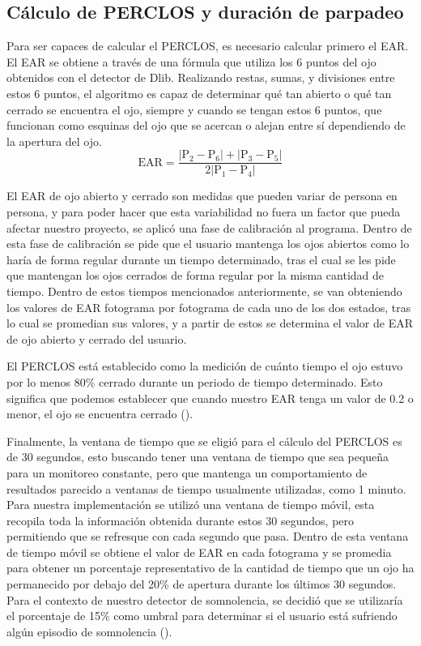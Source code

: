 \subsection{Cálculo de PERCLOS y duración de parpadeo}
Para ser capaces de calcular el PERCLOS, es necesario calcular primero el EAR. El EAR se obtiene a través de una fórmula que utiliza los 6 puntos del ojo obtenidos con el detector de Dlib. Realizando restas, sumas, y divisiones entre estos 6 puntos, el algoritmo es capaz de determinar qué tan abierto o qué tan cerrado se encuentra el ojo, siempre y cuando se tengan estos 6 puntos, que funcionan como esquinas del ojo que se acercan o alejan entre sí dependiendo de la apertura del ojo. 
\[
\mathrm{EAR} = \frac{|\mathrm{P}_2 - \mathrm{P}_6| + |\mathrm{P}_3 - \mathrm{P}_5|}{2|\mathrm{P}_1 - \mathrm{P}_4|}
\]

El EAR de ojo abierto y cerrado son medidas que pueden variar de persona en persona, y para poder hacer que esta variabilidad no fuera un factor que pueda afectar nuestro proyecto, se aplicó una fase de calibración al programa. Dentro de esta fase de calibración se pide que el usuario mantenga los ojos abiertos como lo haría de forma regular durante un tiempo determinado, tras el cual se les pide que mantengan los ojos cerrados de forma regular por la misma cantidad de tiempo. Dentro de estos tiempos mencionados anteriormente, se van obteniendo los valores de EAR fotograma por fotograma de cada uno de los dos estados, tras lo cual se promedian sus valores, y a partir de estos se determina el valor de EAR de ojo abierto y cerrado del usuario.

El PERCLOS está establecido como la medición de cuánto tiempo el ojo estuvo por lo menos 80\% cerrado durante un periodo de tiempo determinado. Esto significa que podemos establecer que cuando nuestro EAR tenga un valor de 0.2 o menor, el ojo se encuentra cerrado (\cite{MinhasPERCLOS}). 

Finalmente, la ventana de tiempo que se eligió para el cálculo del PERCLOS es de 30 segundos, esto buscando tener una ventana de tiempo que sea pequeña para un monitoreo constante, pero que mantenga un comportamiento de resultados parecido a ventanas de tiempo usualmente utilizadas, como 1 minuto. Para nuestra implementación se utilizó una ventana de tiempo móvil, esta recopila toda la información obtenida durante estos 30 segundos, pero permitiendo que se refresque con cada segundo que pasa. Dentro de esta ventana de tiempo móvil se obtiene el valor de EAR en cada fotograma y se promedia para obtener un porcentaje representativo de la cantidad de tiempo que un ojo ha permanecido por debajo del 20\% de apertura durante los últimos 30 segundos. Para el contexto de nuestro detector de somnolencia, se decidió que se utilizaría el porcentaje de 15\% como umbral para determinar si el usuario está sufriendo algún episodio de somnolencia (\cite{LibroPERCLOS}).

